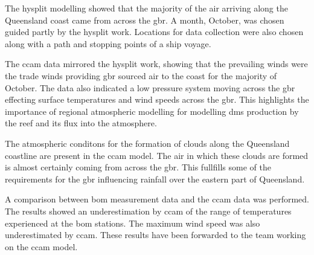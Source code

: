 The \gls{hysplit} modelling showed that the majority of the air arriving along the Queensland coast came from across the \gls{gbr}. A month, October, was chosen guided partly by the \gls{hysplit} work. Locations for data collection were also chosen along with a path and stopping points of a ship voyage.

The \gls{ccam} data mirrored the \gls{hysplit} work, showing that the prevailing winds were the trade winds providing \gls{gbr} sourced air to the coast for the majority of October. The data also indicated a low pressure system moving across the \gls{gbr} effecting surface temperatures and wind speeds across the \gls{gbr}. This highlights the importance of regional atmospheric modelling for modelling \gls{dms} production by the reef and its flux into the atmosphere.

The atmospheric conditons for the formation of clouds along the Queensland coastline are present in the \gls{ccam} model. The air in which these clouds are formed is almost certainly coming from across the \gls{gbr}. This fullfills some of the requirements for the \gls{gbr} influencing rainfall over the eastern part of Queensland. 

A comparison between \gls{bom} measurement data and the \gls{ccam} data was performed. The results showed an underestimation by \gls{ccam} of the range of temperatures experienced at the \gls{bom} stations. The maximum wind speed was also underestimated by \gls{ccam}. These results have been forwarded to the team working on the \gls{ccam} model.